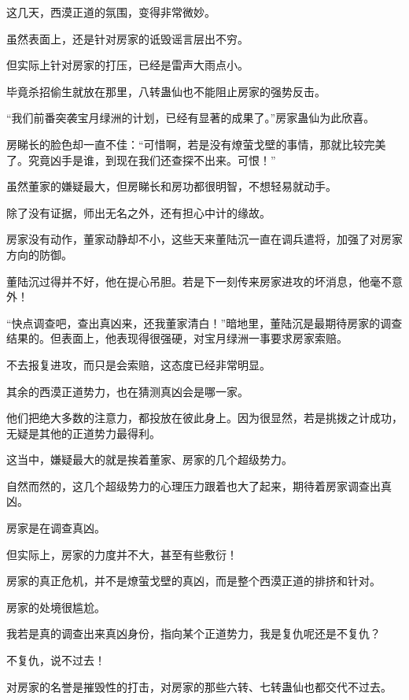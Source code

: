 
\begin{this_body}

这几天，西漠正道的氛围，变得非常微妙。

虽然表面上，还是针对房家的诋毁谣言层出不穷。

但实际上针对房家的打压，已经是雷声大雨点小。

毕竟杀招偷生就放在那里，八转蛊仙也不能阻止房家的强势反击。

“我们前番突袭宝月绿洲的计划，已经有显著的成果了。”房家蛊仙为此欣喜。

房睇长的脸色却一直不佳：“可惜啊，若是没有燎萤戈壁的事情，那就比较完美了。究竟凶手是谁，到现在我们还查探不出来。可恨！”

虽然董家的嫌疑最大，但房睇长和房功都很明智，不想轻易就动手。

除了没有证据，师出无名之外，还有担心中计的缘故。

房家没有动作，董家动静却不小，这些天来董陆沉一直在调兵遣将，加强了对房家方向的防御。

董陆沉过得并不好，他在提心吊胆。若是下一刻传来房家进攻的坏消息，他毫不意外！

“快点调查吧，查出真凶来，还我董家清白！”暗地里，董陆沉是最期待房家的调查结果的。但表面上，他表现得很强硬，对宝月绿洲一事要求房家索赔。

不去报复进攻，而只是会索赔，这态度已经非常明显。

其余的西漠正道势力，也在猜测真凶会是哪一家。

他们把绝大多数的注意力，都投放在彼此身上。因为很显然，若是挑拨之计成功，无疑是其他的正道势力最得利。

这当中，嫌疑最大的就是挨着董家、房家的几个超级势力。

自然而然的，这几个超级势力的心理压力跟着也大了起来，期待着房家调查出真凶。

房家是在调查真凶。

但实际上，房家的力度并不大，甚至有些敷衍！

房家的真正危机，并不是燎萤戈壁的真凶，而是整个西漠正道的排挤和针对。

房家的处境很尴尬。

我若是真的调查出来真凶身份，指向某个正道势力，我是复仇呢还是不复仇？

不复仇，说不过去！

对房家的名誉是摧毁性的打击，对房家的那些六转、七转蛊仙也都交代不过去。


\end{this_body}

